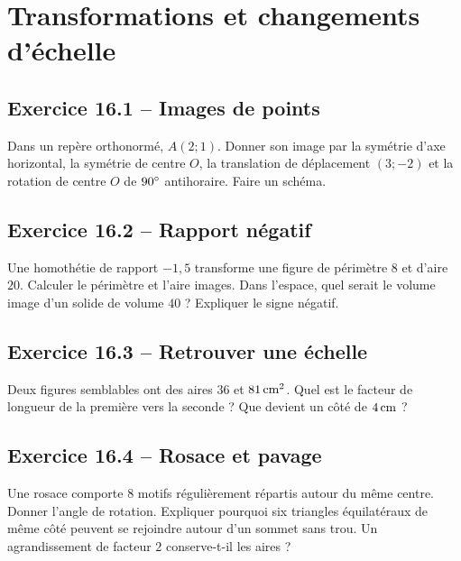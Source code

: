 \chapter{Transformations et changements d'échelle}
\label{exercices:16}
\section*{Exercice 16.1 -- Images de points}
Dans un repère orthonormé, $A(2;1)$. Donner son image par la symétrie d'axe horizontal, la symétrie de centre $O$, la translation de déplacement $(3;-2)$ et la rotation de centre $O$ de $90^{\circ}$ antihoraire. Faire un schéma.

\section*{Exercice 16.2 -- Rapport négatif}
Une homothétie de rapport $-1{,}5$ transforme une figure de périmètre $8$ et d'aire $20$. Calculer le périmètre et l'aire images. Dans l'espace, quel serait le volume image d'un solide de volume $40$ ? Expliquer le signe négatif.

\section*{Exercice 16.3 -- Retrouver une échelle}
Deux figures semblables ont des aires $36$ et $81\,\mathrm{cm^2}$. Quel est le facteur de longueur de la première vers la seconde ? Que devient un côté de $4\,\mathrm{cm}$ ?

\section*{Exercice 16.4 -- Rosace et pavage}
Une rosace comporte $8$ motifs régulièrement répartis autour du même centre. Donner l'angle de rotation. Expliquer pourquoi six triangles équilatéraux de même côté peuvent se rejoindre autour d'un sommet sans trou. Un agrandissement de facteur $2$ conserve-t-il les aires ?
